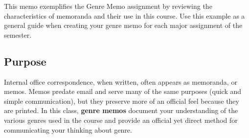 \documentclass[10pt, oneside]{texMemo}	%
\begin{document}

\maketitle
\thispagestyle{empty}
\noindent This memo exemplifies the Genre Memo assignment by reviewing the characteristics of memoranda and their use in this course. Use this example as a general guide when creating your genre memo for each major assignment of the semester.

\subsection*{Purpose} %
\label{sec:background}
Internal office correspondence, when written, often appears as memoranda, or memos. Memos predate email and serve many of the same purposes (quick and simple communication), but they preserve more of an official feel because they are printed. In this class, \textbf{genre memos} document your understanding of the various genres used in the course and provide an official yet direct method for communicating your thinking about genre.
\end{document}
